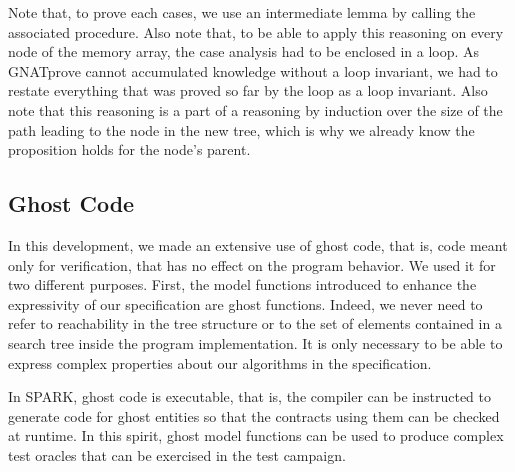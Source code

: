 \documentclass{llncs}
\newcommand{\gnatprove}{GNATprove\xspace}
\begin{document}
Note that, to prove each cases, we use an intermediate lemma by calling the associated procedure.
Also note that, to be able to apply this reasoning on every node of the memory array, the case
analysis had to be enclosed in a loop. As \gnatprove cannot accumulated knowledge without a loop
invariant, we had to restate everything that was proved so far by the loop as a loop invariant.
Also note that this reasoning is a part of a reasoning by induction over the size of the path
leading to the node in the new tree, which is why we already know the proposition holds for the
node's parent.

\subsection{Ghost Code}



In this development, we made an extensive use of ghost code, that is, code meant only for verification,
that has no effect on the program behavior. We used it for two different purposes. First, the model
functions introduced to enhance the expressivity of our specification are ghost functions. Indeed, we
never need to refer to reachability in the tree structure or to the set of elements contained in a
search tree inside the program implementation. It is only necessary to be able to express complex
properties about our algorithms in the specification.

In SPARK, ghost code is executable, that is, the compiler can be instructed to generate code for ghost
entities so that the contracts using them can be checked at runtime. In this spirit, ghost model functions
can be used to produce complex test oracles that can be exercised in the test campaign.
\end{document}
